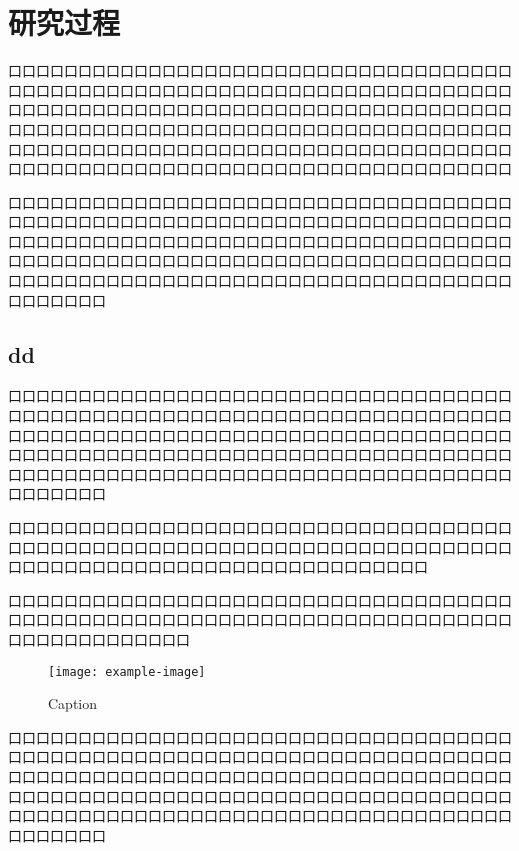 \chapter{研究过程}

口口口口口口口口口口口口口口口口口口口口口口口口口口口口口口口口口口口口口口口口口口口口口口口口口口口口口口口口口口口口口口口口口口口口口口口口口口口口口口口口口口口口口口口口口口口口口口口口口口口口口口口口口口口口口口口口口口口口口口口口口口口口口口口口口口口口口口口口口口口口口口口口口口口口口口口口口口口口口口口口口口口口口口口口口口口口口口口口口口口口口口口口口口口口口口口口口口口口口口口口口口口口口口口口口口口口口口口口

口口口口口口口口口口口口口口口口口口口口口口口口口口口口口口口口口口口口口口口口口口口口口口口口口口口口口口口口口口口口口口口口口口口口口口口口口口口口口口口口口口口口口口口口口口口口口口口口口口口口口口口口口口口口口口口口口口口口口口口口口口口口口口口口口口口口口口口口口口口口口口口口口口口口口口口口口口口口口口口口口口口口口口口口口口口口口口口口口口口口口口口口口口口

\section{dd}

口口口口口口口口口口口口口口口口口口口口口口口口口口口口口口口口口口口口口口口口口口口口口口口口口口口口口口口口口口口口口口口口口口口口口口口口口口口口口口口口口口口口口口口口口口口口口口口口口口口口口口口口口口口口口口口口口口口口口口口口口口口口口口口口口口口口口口口口口口口口口口口口口口口口口口口口口口口口口口口口口口口口口口口口口口口口口口口口口口口口口口口口口口口



口口口口口口口口口口口口口口口口口口口口口口口口口口口口口口口口口口口口口口口口口口口口口口口口口口口口口口口口口口口口口口口口口口口口口口口口口口口口口口口口口口口口口口口口口口口口口口口口口口口口口口

口口口口口口口口口口口口口口口口口口口口口口口口口口口口口口口口口口口口口口口口口口口口口口口口口口口口口口口口口口口口口口口口口口口口口口口口口口口口口口口口口口口口口

\begin{figure}
    \centering
    \texttt{[image: example-image]}
    \caption{Caption}
    \label{fig:my_label}
\end{figure}

口口口口口口口口口口口口口口口口口口口口口口口口口口口口口口口口口口口口口口口口口口口口口口口口口口口口口口口口口口口口口口口口口口口口口口口口口口口口口口口口口口口口口口口口口口口口口口口口口口口口口口口口口口口口口口口口口口口口口口口口口口口口口口口口口口口口口口口口口口口口口口口口口口口口口口口口口口口口口口口口口口口口口口口口口口口口口口口口口口口口口口口口口口口

